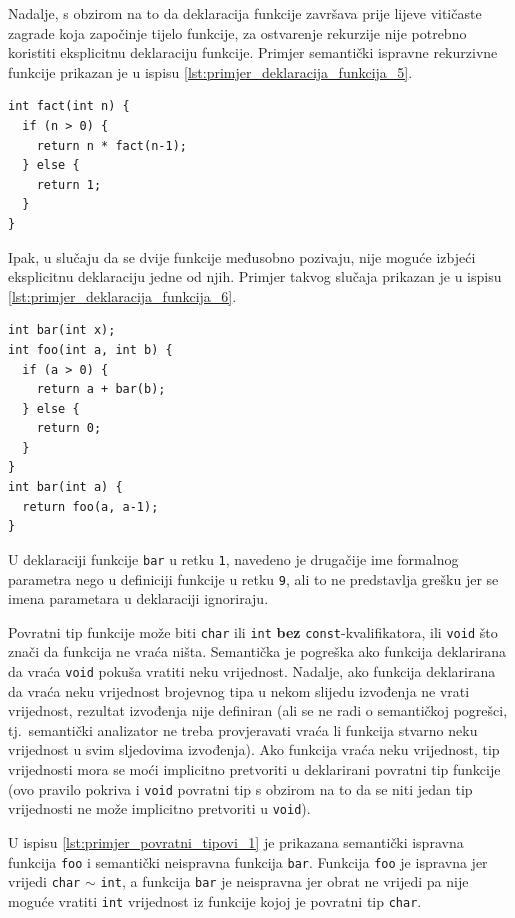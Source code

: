 \documentclass[times, 12pt, utf8]{book}
\begin{document}
Nadalje, s obzirom na to da deklaracija funkcije završava prije lijeve vitičaste zagrade koja započinje tijelo funkcije, za ostvarenje rekurzije nije potrebno koristiti eksplicitnu deklaraciju funkcije.
Primjer semantički ispravne rekurzivne funkcije prikazan je u ispisu \ref{lst:primjer_deklaracija_funkcija_5}.

\begin{lstlisting}[caption={Rekurzivne funkcije ne treba eksplicitno deklarirati prije definicije.},label=lst:primjer_deklaracija_funkcija_5]
int fact(int n) {
  if (n > 0) {
    return n * fact(n-1);
  } else {
    return 1;
  }
}
\end{lstlisting}

Ipak, u slučaju da se dvije funkcije međusobno pozivaju, nije moguće izbjeći eksplicitnu deklaraciju jedne od njih.
Primjer takvog slučaja prikazan je u ispisu \ref{lst:primjer_deklaracija_funkcija_6}.

\begin{lstlisting}[caption={Nužna deklaracija funkcije \texttt{bar} prije definicije funkcije \texttt{foo}.},label=lst:primjer_deklaracija_funkcija_6]
int bar(int x);
int foo(int a, int b) {
  if (a > 0) {
    return a + bar(b);
  } else {
    return 0;
  }
}
int bar(int a) {
  return foo(a, a-1);
}
\end{lstlisting}

U deklaraciji funkcije \verb|bar| u retku \verb|1|, navedeno je drugačije ime formalnog parametra nego u definiciji funkcije u retku \verb|9|, ali to ne predstavlja grešku jer se imena parametara u deklaraciji ignoriraju.

Povratni tip funkcije može biti \verb|char| ili \verb|int| \textbf{bez} \verb|const|-kvalifikatora, ili \verb|void| što znači da funkcija ne vraća ništa.
Semantička je pogreška ako funkcija deklarirana da vraća \verb|void| pokuša vratiti neku vrijednost.
Nadalje, ako funkcija deklarirana da vraća neku vrijednost brojevnog tipa u nekom slijedu izvođenja ne vrati vrijednost, rezultat izvođenja nije definiran (ali se ne radi o semantičkoj pogrešci, tj.~semantički analizator ne treba provjeravati vraća li funkcija stvarno neku vrijednost u svim sljedovima izvođenja).
Ako funkcija vraća neku vrijednost, tip vrijednosti mora se moći implicitno pretvoriti u deklarirani povratni tip funkcije (ovo pravilo pokriva i \verb|void| povratni tip s obzirom na to da se niti jedan tip vrijednosti ne može implicitno pretvoriti u \verb|void|).

U ispisu \ref{lst:primjer_povratni_tipovi_1} je prikazana semantički ispravna funkcija \verb|foo| i semantički neispravna funkcija \verb|bar|.
Funkcija \verb|foo| je ispravna jer vrijedi \verb|char| \(\sim\) \verb|int|, a funkcija \verb|bar| je neispravna jer obrat ne vrijedi pa nije moguće vratiti \verb|int| vrijednost iz funkcije kojoj je povratni tip \verb|char|.
\end{document}
